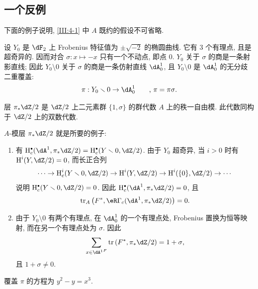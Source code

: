 \subsection{一个反例}\label{III:4-5}

下面的例子说明, \ref{III:4-1} 中 $A$ 既约的假设不可省略.

设 $Y_0$ 是 $\dF_2$ 上 Frobenius 特征值为 $\pm \sqrt{-2}$ 的椭圆曲线. 它有 $3$ 个有理点, 且是超奇异的. 因而对合 $\sigma:x\mapsto -x$ 只有一个不动点, 即点 $0$. $Y_0$ 关于 $\sigma$ 的商是一条射影直线; 因此 $Y_0\setminus 0$ 关于 $\sigma$ 的商是一条仿射直线 $\dA_0^1$, 且 $Y_0\setminus 0$ 是 $\dA_0^1$ 的无分歧二重覆盖:
\[
  \pi:Y_0\setminus 0 \to \dA_0^1 \qquad \text{, $\pi=\pi\sigma$.}
\]

层 $\pi_*\dZ/2$ 是 $\dZ/2$ 上二元素群 $\{1,\sigma\}$ 的群代数 $A$ 上的秩一自由模. 此代数同构于 $\dZ/2$ 上的双数代数.

$A$-模层 $\pi_*\dZ/2$ 就是所要的例子:
\begin{enumerate}[\indent a)]
  \item 有 $\h_c^\bullet(\dA^1,\pi_*\dZ/2) = \h_c^\bullet(Y\setminus 0,\dZ/2)$. 由于 $Y_0$ 超奇异, 当 $i>0$ 时有 $\h^i(Y,\dZ/2)=0$, 而长正合列
    \[
      \cdots \to \h_c^i(Y\setminus 0,\dZ/2) \to \h^i(Y,\dZ/2) \to \h^i(\{0\},\dZ/2) \to \cdots
    \]
    说明 $\h_c^\bullet(Y\setminus 0,\dZ/2)=0$. 因此 $\h_c^\bullet(\dA^1,\pi_*\dZ/2)=0$, 且
    \[
      \tr_A\left(F^*,\eR\Gamma_c(\dA^1,\pi_*\dZ/2)\right) = 0 \text{.}
    \]
  \item 由于 $Y_0\setminus 0$ 有两个有理点, 在 $\dA_0^1$ 的一个有理点处, Frobenius 置换为恒等映射, 而在另一个有理点处为 $\sigma$. 因此
    \[
      \sum_{x\in {\dA^1}^F} \tr\left(F^*,\pi_*\dZ/2\right) = 1+\sigma \text{,}
    \]
    且 $1+\sigma\ne 0$.
\end{enumerate}

覆盖 $\pi$ 的方程为 $y^2-y=x^3$.
